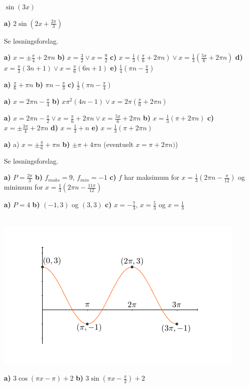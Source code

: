  $ \sin(3x) $

 \textbf{a)} $2\sin\left(2x+\frac{2\pi}{3}\right)  $ 

 Se løsningsforslag.

 \textbf{a)} $ x = \pm \frac{\pi}{4}+2\pi n $ \textbf{b)} $ x=\frac{3}{2} \vee x = \frac{9}{2} $ \textbf{c)} $ x=\frac{1}{3}(\frac{\pi}{6}+2\pi n)\vee x= \frac{1}{3}(\frac{5\pi}{6}+2\pi n) $ \textbf{d)} $ x=\frac{\pi}{3}(3n+1)\vee x= \frac{\pi}{6}(6 n+1)$ \textbf{e)} $\frac{1}{4}(\pi n-\frac{\pi}{3} )$

 \textbf{a)} $ \frac{\pi}{6}+\pi n $ \textbf{b)} $ \pi n-\frac{\pi}{3} $ \textbf{c)} $ \frac{1}{2}\left(\pi n-\frac{\pi}{4}\right) $

\textbf{a)} $ x=2\pi n-\frac{\pi}{4} $
\textbf{b)} $ x\pi^2(4n-1)\vee x=2\pi\left(\frac{\pi}{6}+2\pi n\right) $ 

\textbf{a)} ${ x= 2\pi n-\frac{\pi}{2} \vee x = \frac{\pi}{6}+2\pi n \vee x = \frac{5\pi}{6}+2\pi n}$ \textbf{b)} ${ x=\frac{1}{3}(\pi +2\pi n) }$ \textbf{c)} ${ x = \pm \frac{3\pi}{4}+2\pi n  }$ \textbf{d)} ${ x=\frac{1}{3}+n }$ \textbf{e)} ${ x=\frac{1}{3}(\pi +2\pi n) }$

\textbf{a)} a) $ x = \pm \frac{\pi}{6}+\pi n $ \textbf{b)} $ \pm \pi + 4\pi n$ (eventuelt $ x=\pi +2\pi n) $)

 Se løsningsforslag.

 \textbf{a)} $ P = \frac{2\pi}{3} $ \textbf{b)} $ f_{maks}=9 $, $ f_{min}=-1 $ \textbf{c)} $ f $ har maksimum for $ x= \frac{1}{3}\left(2\pi n-\frac{\pi}{12}\right) $ og minimum for $ x=\frac{1}{3}(2\pi n-\frac{11\pi}{12}) $

 \textbf{a)} $ P=4 $ \textbf{b)} $ (-1, 3) $ og $ (3, 3) $ \textbf{c)}  $ x=-\frac{7}{3} $, $ x=\frac{5}{3} $ og $ x=\frac{1}{3} $

\\
\vs
\includegraphics[]{skissin}\vs

\textbf{a)} $ 3\cos(\pi x - \pi) +2 $ \textbf{b)} $ 3\sin\left(\pi x-\frac{\pi}{2}\right) +2 $





